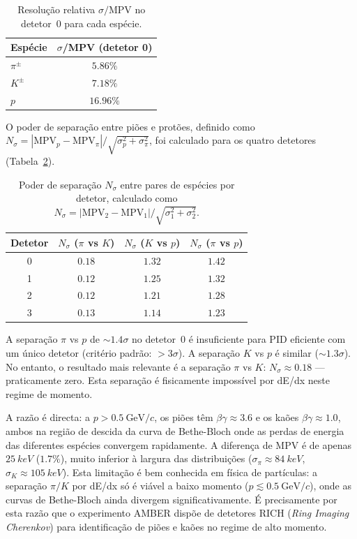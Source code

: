 \documentclass[12pt,a4paper]{article}
\begin{document}
\begin{table}[H]
  \centering
  \caption{Resolução relativa $\sigma/\text{MPV}$ no detetor~0 para cada espécie.}
  \label{tab:resolucao}
  \begin{tabular}{lc}
    \toprule
    \textbf{Espécie} & \textbf{$\sigma$/MPV (detetor 0)} \\
    \midrule
    $\pi^\pm$ & $5.86\%$ \\
    $K^\pm$   & $7.18\%$ \\
    $p$       & $16.96\%$ \\
    \bottomrule
  \end{tabular}
\end{table}

O poder de separação entre piões e protões, definido como
$N_\sigma = |\text{MPV}_p - \text{MPV}_\pi| / \sqrt{\sigma_p^2 + \sigma_\pi^2}$,
foi calculado para os quatro detetores (Tabela~\ref{tab:separacao}).

\begin{table}[H]
  \centering
  \caption{Poder de separação $N_\sigma$ entre pares de espécies por detetor,
    calculado como $N_\sigma = |\text{MPV}_2 - \text{MPV}_1| /
    \sqrt{\sigma_1^2 + \sigma_2^2}$.}
  \label{tab:separacao}
  \begin{tabular}{cccc}
    \toprule
    \textbf{Detetor} & \textbf{$N_\sigma$ ($\pi$ vs $K$)} &
    \textbf{$N_\sigma$ ($K$ vs $p$)} & \textbf{$N_\sigma$ ($\pi$ vs $p$)} \\
    \midrule
    0 & $0.18$ & $1.32$ & $1.42$ \\
    1 & $0.12$ & $1.25$ & $1.32$ \\
    2 & $0.12$ & $1.21$ & $1.28$ \\
    3 & $0.13$ & $1.14$ & $1.23$ \\
    \bottomrule
  \end{tabular}
\end{table}

A separação $\pi$ vs $p$ de $\sim 1.4\sigma$ no detetor~0 é insuficiente para
PID eficiente com um único detetor (critério padrão: $> 3\sigma$). A separação
$K$ vs $p$ é similar ($\sim 1.3\sigma$). No entanto, o resultado mais relevante
é a separação $\pi$ vs $K$: $N_\sigma \approx 0.18$ --- praticamente zero.
Esta separação é fisicamente impossível por dE/dx neste regime de momento.

A razão é directa: a $p > 0.5~\text{GeV}/c$, os piões têm $\beta\gamma \approx
3.6$ e os kaões $\beta\gamma \approx 1.0$, ambos na região de descida da curva
de Bethe-Bloch onde as perdas de energia das diferentes espécies convergem
rapidamente. A diferença de MPV é de apenas $\SI{25}{keV}$ ($1.7\%$), muito
inferior à largura das distribuições ($\sigma_\pi \approx \SI{84}{keV}$,
$\sigma_K \approx \SI{105}{keV}$). Esta limitação é bem conhecida em física de
partículas: a separação $\pi/K$ por dE/dx só é viável a baixo momento
($p \lesssim 0.5~\text{GeV}/c$), onde as curvas de Bethe-Bloch ainda divergem
significativamente. É precisamente por esta razão que o experimento AMBER dispõe
de detetores RICH (\textit{Ring Imaging Cherenkov}) para identificação de piões
e kaões no regime de alto momento.
\end{document}
